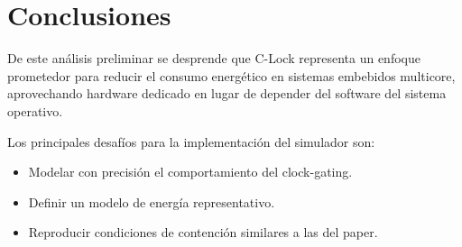 
\section{Conclusiones}


De este análisis preliminar se desprende que C-Lock representa un enfoque prometedor
para reducir el consumo energético en sistemas embebidos multicore, aprovechando
hardware dedicado en lugar de depender del software del sistema operativo.

Los principales desafíos para la implementación del simulador son:
\begin{itemize}
    \item Modelar con precisión el comportamiento del clock-gating.
    \item Definir un modelo de energía representativo.
    \item Reproducir condiciones de contención similares a las del paper.
\end{itemize}
